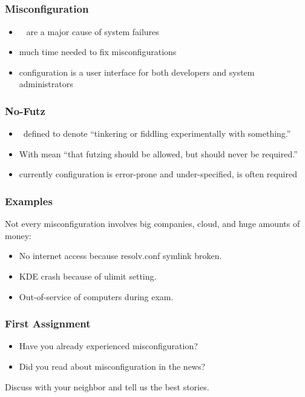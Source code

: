 \subsection{}
{
%
\begin{frame}
	\frametitle{Misconfiguration}
	\begin{itemize}
		\item {}~\cite{yin2011empirical,su2007autobash,attariyan2010automating,xu2015systems}
			are a major cause of system failures~\cite{wool2004quantitative,oppenheimer2003internet,pertet2005causes}
		\item much time needed to fix misconfigurations~\cite{rabkin2011static,oppenheimer2003internet,yin2011empirical,mahajan2002bgp}
		\item configuration is a user interface for both developers and system administrators
	\end{itemize}
\end{frame}
\begin{frame}
	\frametitle{No-Futz}
	\begin{itemize}
		\item \citet{holland2001nofutz}~defined  to denote \enquote{tinkering or fiddling experimentally with something.}
		\item With  \citet{holland2001nofutz} mean \enquote{that futzing should be allowed, but should never be required.}
		\item currently configuration is error-prone and under-specified,  is often required
	\end{itemize}
\end{frame}
\begin{frame}
	\frametitle{Examples}
	Not every misconfiguration involves big companies, cloud, and huge amounts of money:
	\begin{itemize}
		\item No internet access because resolv.conf symlink broken.
		\item KDE crash because of ulimit setting.
		\item Out-of-service of computers during exam.
	\end{itemize}
\end{frame}
}
\begin{assignment}
	\frametitle{First Assignment}
	\begin{itemize}
		\item Have you already experienced misconfiguration?
		\item Did you read about misconfiguration in the news?
	\end{itemize}
	\begin{task}
	Discuss with your neighbor and tell us the best stories.
	\end{task}
\end{assignment}

